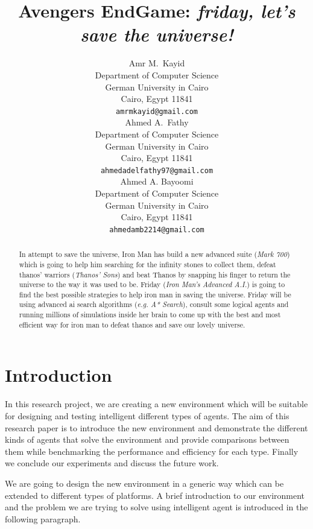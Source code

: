 \documentclass{article}
\title{Avengers EndGame: \emph{friday, let's save the universe!}}
\author{
  Amr M.~Kayid\\
  Department of Computer Science\\
  German University in Cairo\\
  Cairo, Egypt 11841 \\
  \texttt{amrmkayid@gmail.com} \\
   \And
 Ahmed A.~Fathy \\
 Department of Computer Science\\
 German University in Cairo\\
 Cairo, Egypt 11841 \\
  \texttt{ahmedadelfathy97@gmail.com} \\
    \And
  Ahmed A. Bayoomi \\
  Department of Computer Science\\
  German University in Cairo\\
  Cairo, Egypt 11841 \\
  \texttt{ahmedamb2214@gmail.com} \\
}
\begin{document}
\maketitle

\begin{abstract}
  In attempt to save the universe, Iron Man has build a new advanced suite (\textit{Mark 700}) which is going to help him searching for the infinity stones to collect them, defeat thanos' warriors (\textit{Thanos' Sons}) and beat Thanos by snapping his finger to return the universe to the way it was used to be. Friday (\textit{Iron Man's Advanced A.I.}) is going to find the best possible strategies to help iron man in saving the universe. Friday will be using advanced ai search algorithms (\textit{e.g. A* Search}), consult some logical agents and running millions of simulations inside her brain to come up with the best and most efficient way for iron man to defeat thanos and save our lovely universe.
\end{abstract}




\section{Introduction}
In this research project, we are creating a new environment which will be suitable for designing and testing intelligent different types of agents. The aim of this research paper is to introduce the new environment and demonstrate the different kinds of agents that solve the environment and provide comparisons between them while benchmarking the performance and efficiency for each type. Finally we conclude our experiments and discuss the future work.

We are going to design the new environment in a generic way which can be extended to different types of platforms. A brief introduction to our environment and the problem we are trying to solve using intelligent agent is introduced in the following paragraph. 
\end{document}
